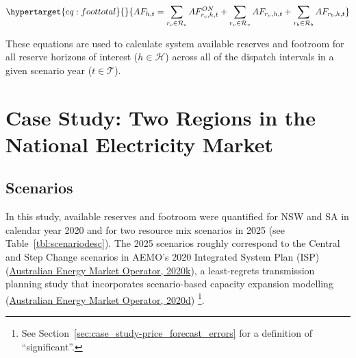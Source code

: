 \documentclass[12pt,a4paper,]{report}
\begin{document}
\begin{equation}\protect\hypertarget{eq:foottotal}{}{ AF_{h,t}=\sum_{r_c \in \mathcal{R}_c}{AF_{r_c,h,t}^{ON}} + \sum_{r_v \in \mathcal{R}_v}{AF_{r_v,h,t}} + \sum_{r_b \in \mathcal{R}_b}{AF_{r_b,h,t}} }\label{eq:foottotal}\end{equation}

These equations are used to calculate system available reserves and
footroom for all reserve horizons of interest (\(h \in \mathcal{H}\))
across all of the dispatch intervals in a given scenario year
(\(t \in \mathcal{T}\)).

\hypertarget{sec:reserves-casestudy}{%
\section{Case Study: Two Regions in the National Electricity
Market}\label{sec:reserves-casestudy}}

\hypertarget{scenarios}{%
\subsection{Scenarios}\label{scenarios}}

In this study, available reserves and footroom were quantified for NSW
and SA in calendar year 2020 and for two resource mix scenarios in 2025
(see Table~\ref{tbl:scenariodesc}). The 2025 scenarios roughly
correspond to the Central and Step Change scenarios in AEMO's 2020
Integrated System Plan (ISP)
(\protect\hyperlink{ref-australianenergymarketoperator2020ISPGeneration2020}{Australian
Energy Market Operator, 2020k}), a least-regrets transmission planning
study that incorporates scenario-based capacity expansion modelling
(\protect\hyperlink{ref-australianenergymarketoperator2020IntegratedSystem2020}{Australian
Energy Market Operator, 2020d}) \footnote{See
  Section~\ref{sec:case_study-price_forecast_errors} for a definition of
  ``significant''.}.
\end{document}

